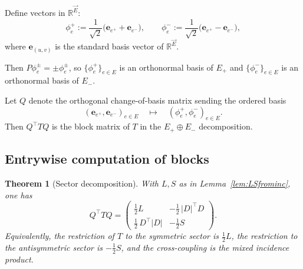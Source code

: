 \documentclass[11pt]{article}
\newtheorem{theorem}{Theorem}
\begin{document}
Define vectors in $\mathbb R^{\vec E}$:
\[
\phi_e^+ := \frac{1}{\sqrt2}\bigl( \mathbf e_{e^+}+\mathbf e_{e^-}\bigr),
\qquad
\phi_e^- := \frac{1}{\sqrt2}\bigl( \mathbf e_{e^+}-\mathbf e_{e^-}\bigr),
\]
where $\mathbf e_{(u,v)}$ is the standard basis vector of $\mathbb R^{\vec E}$.

Then $P\phi_e^\pm=\pm\phi_e^\pm$, so $\{\phi_e^+\}_{e\in E}$ is an orthonormal basis of $E_+$ and $\{\phi_e^-\}_{e\in E}$ is an orthonormal basis of $E_-$.

Let $Q$ denote the orthogonal change-of-basis matrix sending the ordered basis
\[
(\mathbf e_{e^+},\mathbf e_{e^-})_{e\in E}
\quad\mapsto\quad
(\phi_e^+,\phi_e^-)_{e\in E}.
\]
Then $Q^\top T Q$ is the block matrix of $T$ in the $E_+\oplus E_-$ decomposition.

\subsection{Entrywise computation of blocks}

\begin{theorem}[Sector decomposition]\label{thm:sector}
With $L,S$ as in Lemma~\ref{lem:LSfrominc}, one has
\[
Q^\top T Q
=
\begin{pmatrix}
\frac12 L & -\frac12\,|D|^\top D\\[4pt]
\frac12\,D^\top|D| & -\frac12 S
\end{pmatrix}.
\]
Equivalently, the restriction of $T$ to the symmetric sector is $\frac12 L$, the restriction to the antisymmetric sector is $-\frac12 S$, and the cross-coupling is the mixed incidence product.
\end{theorem}
\end{document}
